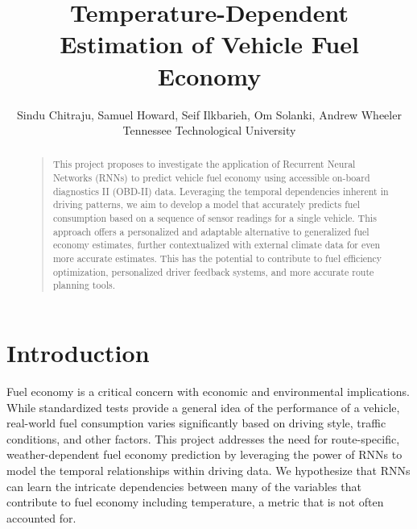 \documentclass[letterpaper]{article}
\begin{document}

\nocopyright

\title{Temperature-Dependent Estimation of Vehicle Fuel Economy}
\author{Sindu Chitraju, Samuel Howard, Seif Ilkbarieh, Om Solanki, Andrew Wheeler\\
Tennessee Technological University
}

\maketitle

\begin{abstract}
\begin{quote}
    This project proposes to investigate the application of Recurrent Neural Networks (RNNs) to predict vehicle fuel economy using accessible on-board diagnostics II (OBD-II) data. 
    Leveraging the temporal dependencies inherent in driving patterns, we aim to develop a model that accurately predicts fuel consumption based on a sequence of sensor readings for a single vehicle.
    This approach offers a personalized and adaptable alternative to generalized fuel economy estimates, further contextualized with external climate data for even more accurate estimates.
    This has the potential to contribute to fuel efficiency optimization, personalized driver feedback systems, and more accurate route planning tools. 
\end{quote}
\end{abstract}

\section{Introduction}

\noindent Fuel economy is a critical concern with economic and environmental implications. 
While standardized tests provide a general idea of the performance of a vehicle, 
real-world fuel consumption varies significantly based on driving style, traffic conditions, and other factors.
This project addresses the need for route-specific, weather-dependent fuel economy prediction by leveraging the power of RNNs to model the temporal relationships within driving data.
We hypothesize that RNNs can learn the intricate dependencies between many of the variables that contribute to fuel economy including temperature, a metric that is not often accounted for.
\end{document}
